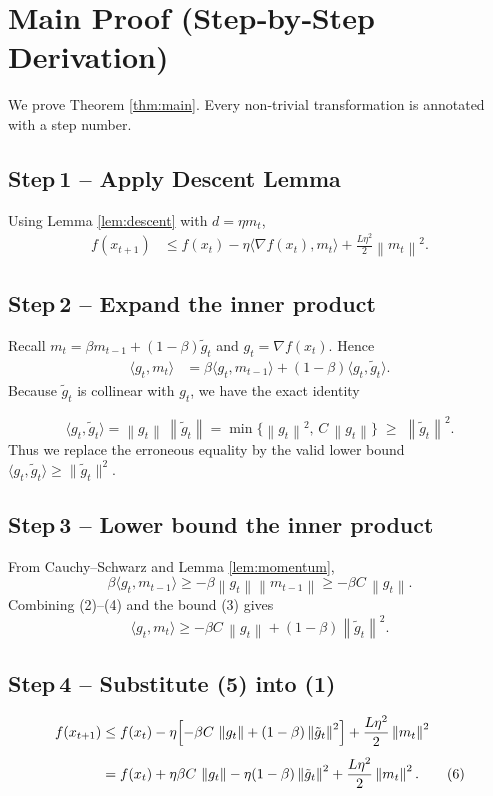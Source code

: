 \documentclass{article}
\newcommand{\norm}[1]{\left\lVert#1\right\rVert}
\newcommand{\grad}{\nabla}
\begin{document}
\section*{Main Proof (Step‑by‑Step Derivation)}
We prove Theorem \ref{thm:main}. Every non‑trivial transformation is annotated with a step number.

\subsection*{Step 1 – Apply Descent Lemma}
Using Lemma \ref{lem:descent} with $d=\eta m_t$,
\begin{align}
    f(x_{t+1})
    &\le f(x_t)-\eta\langle \grad f(x_t),m_t\rangle
          +\frac{L\eta^{2}}{2}\norm{m_t}^{2}. \tag{1}
\end{align}

\subsection*{Step 2 – Expand the inner product}
Recall $m_t=\beta m_{t-1}+(1-\beta)\tilde g_t$ and $g_t=\grad f(x_t)$. Hence
\begin{align}
    \langle g_t,m_t\rangle
    &=\beta\langle g_t,m_{t-1}\rangle+(1-\beta)\langle g_t,\tilde g_t\rangle . \tag{2}
\end{align}
Because $\tilde g_t$ is collinear with $g_t$, we have the exact identity  

\[
\langle g_t,\tilde g_t\rangle
   = \norm{g_t}\,\norm{\tilde g_t}
   = \min\bigl\{\norm{g_t}^{2},\,C\,\norm{g_t}\bigr\}
   \;\ge\; \norm{\tilde g_t}^{2}. \tag{3}
\]
Thus we replace the erroneous equality by the valid lower bound $\langle g_t,\tilde g_t\rangle\ge\|\tilde g_t\|^{2}$.

\subsection*{Step 3 – Lower bound the inner product}
From Cauchy–Schwarz and Lemma \ref{lem:momentum},
\[
\beta\langle g_t,m_{t-1}\rangle
   \ge -\beta\norm{g_t}\norm{m_{t-1}}
   \ge -\beta C\,\norm{g_t}. \tag{4}
\]
Combining (2)–(4) and the bound (3) gives
\[
\langle g_t,m_t\rangle
   \ge -\beta C\,\norm{g_t}+(1-\beta)\norm{\tilde g_t}^{2}. \tag{5}
\]

\subsection*{Step 4 – Substitute (5) into (1)}
\begin{align}
    f(x_{t+1})
    &\le f(x_t)-\eta\Bigl[-\beta C\,\norm{g_t}+(1-\beta)\norm{\tilde g_t}^{2}\Bigr]
          +\frac{L\eta^{2}}{2}\norm{m_t}^{2}\nonumber\\[4pt]
    &= f(x_t)+\eta\beta C\,\norm{g_t}
       -\eta(1-\beta)\norm{\tilde g_t}^{2}
       +\frac{L\eta^{2}}{2}\norm{m_t}^{2}. \tag{6}
\end{align}
\end{document}

